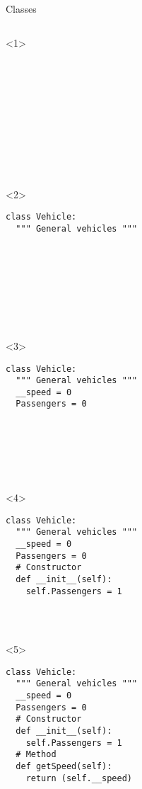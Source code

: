 \begin{frame}[fragile]{Classes}

  \begin{columns}[onlytextwidth]
    \begin{column}{\textwidth}

      \begin{onlyenv}<1>
        \begin{lstlisting}[style=python]











 \end{lstlisting}
      \end{onlyenv}

      \begin{onlyenv}<2>
        \begin{lstlisting}[style=python]
class Vehicle:
  """ General vehicles """









 \end{lstlisting}
      \end{onlyenv}

      \begin{onlyenv}<3>
        \begin{lstlisting}[style=python]
class Vehicle:
  """ General vehicles """
  __speed = 0
  Passengers = 0







 \end{lstlisting}
      \end{onlyenv}

      \begin{onlyenv}<4>
        \begin{lstlisting}[style=python]
class Vehicle:
  """ General vehicles """
  __speed = 0
  Passengers = 0
  # Constructor
  def __init__(self):
    self.Passengers = 1




 \end{lstlisting}
      \end{onlyenv}

      \begin{onlyenv}<5>
        \begin{lstlisting}[style=python]
class Vehicle:
  """ General vehicles """
  __speed = 0
  Passengers = 0
  # Constructor
  def __init__(self):
    self.Passengers = 1
  # Method
  def getSpeed(self):
    return (self.__speed)


\end{lstlisting}
\end{onlyenv}
\end{column}
\end{columns}
\end{frame}
